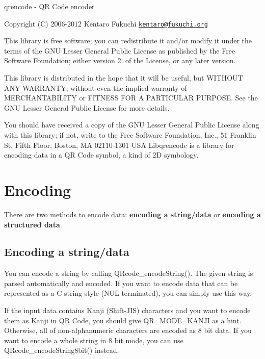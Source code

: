 qrencode -\/ QR Code encoder

Copyright (C) 2006-\/2012 Kentaro Fukuchi \href{mailto:kentaro@fukuchi.org}{\tt kentaro@fukuchi.\+org}

This library is free software; you can redistribute it and/or modify it under the terms of the G\+NU Lesser General Public License as published by the Free Software Foundation; either version 2. of the License, or any later version.

This library is distributed in the hope that it will be useful, but W\+I\+T\+H\+O\+UT A\+NY W\+A\+R\+R\+A\+N\+TY; without even the implied warranty of M\+E\+R\+C\+H\+A\+N\+T\+A\+B\+I\+L\+I\+TY or F\+I\+T\+N\+E\+SS F\+OR A P\+A\+R\+T\+I\+C\+U\+L\+AR P\+U\+R\+P\+O\+SE. See the G\+NU Lesser General Public License for more details.

You should have received a copy of the G\+NU Lesser General Public License along with this library; if not, write to the Free Software Foundation, Inc., 51 Franklin St, Fifth Floor, Boston, MA 02110-\/1301 U\+SA Libqrencode is a library for encoding data in a QR Code symbol, a kind of 2D symbology.\hypertarget{index_encoding}{}\section{Encoding}\label{index_encoding}
There are two methods to encode data\+: {\bfseries encoding a string/data} or {\bfseries encoding a structured data}.\hypertarget{index_encoding-string}{}\subsection{Encoding a string/data}\label{index_encoding-string}
You can encode a string by calling Q\+Rcode\+\_\+encode\+String(). The given string is parsed automatically and encoded. If you want to encode data that can be represented as a C string style (N\+UL terminated), you can simply use this way.

If the input data contains Kanji (Shift-\/\+J\+IS) characters and you want to encode them as Kanji in QR Code, you should give Q\+R\+\_\+\+M\+O\+D\+E\+\_\+\+K\+A\+N\+JI as a hint. Otherwise, all of non-\/alphanumeric characters are encoded as 8 bit data. If you want to encode a whole string in 8 bit mode, you can use Q\+Rcode\+\_\+encode\+String8bit() instead.

